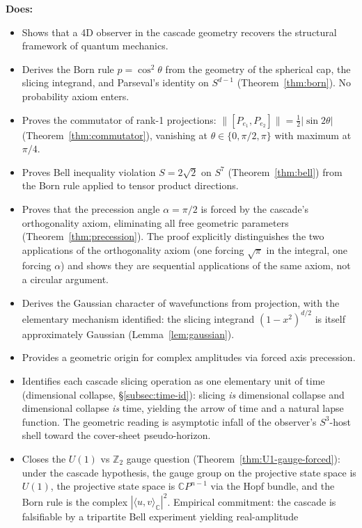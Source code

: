 \documentclass[12pt,a4paper]{article}
\begin{document}
\textbf{Does:}
\begin{itemize}
\item Shows that a 4D observer in the cascade geometry recovers the structural framework of
quantum mechanics.
\item Derives the Born rule $p = \cos^2\theta$ from the geometry of the spherical cap, the
slicing integrand, and Parseval's identity on $S^{d-1}$ (Theorem~\ref{thm:born}). No
probability axiom enters.
\item Proves the commutator of rank-1 projections:
$\|[P_{e_1},P_{e_2}]\| = \tfrac{1}{2}|\sin 2\theta|$
(Theorem~\ref{thm:commutator}), vanishing at $\theta\in\{0,\pi/2,\pi\}$ with maximum
at $\pi/4$.
\item Proves Bell inequality violation $S = 2\sqrt{2}$ on $S^7$
(Theorem~\ref{thm:bell}) from the Born rule applied to tensor product directions.
\item Proves that the precession angle $\alpha=\pi/2$ is forced by the cascade's
orthogonality axiom, eliminating all free geometric parameters
(Theorem~\ref{thm:precession}). The proof explicitly distinguishes the two applications of
the orthogonality axiom (one forcing $\sqrt{\pi}$ in the integral, one forcing $\alpha$)
and shows they are sequential applications of the same axiom, not a circular argument.
\item Derives the Gaussian character of wavefunctions from projection, with the elementary
mechanism identified: the slicing integrand $(1-x^2)^{d/2}$ is itself approximately Gaussian
(Lemma~\ref{lem:gaussian}).
\item Provides a geometric origin for complex amplitudes via forced axis precession.
\item Identifies each cascade slicing operation as one elementary unit of time
(dimensional collapse, \S\ref{subsec:time-id}): slicing \emph{is} dimensional
collapse and dimensional collapse \emph{is} time, yielding the arrow of time
and a natural lapse function. The geometric reading is asymptotic infall of
the observer's $S^3$-host shell toward the cover-sheet pseudo-horizon.
\item Closes the $U(1)$ vs $\mathbb{Z}_2$ gauge question
(Theorem~\ref{thm:U1-gauge-forced}): under the cascade hypothesis, the gauge
group on the projective state space is $U(1)$, the projective state space is
$\mathbb{C}P^{n-1}$ via the Hopf bundle, and the Born rule is the complex
$|\langle u, v\rangle_{\mathbb{C}}|^2$. Empirical commitment: the cascade is
falsifiable by a tripartite Bell experiment yielding real-amplitude

\end{itemize}
\end{document}
